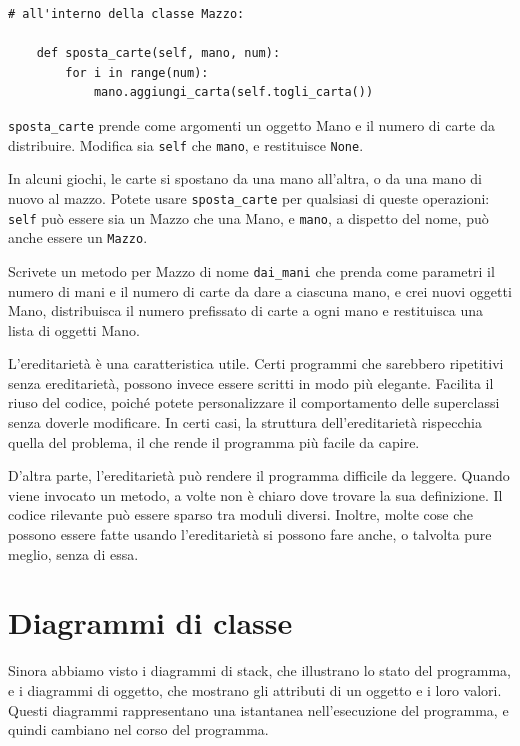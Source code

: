 \documentclass[10pt]{book}
\begin{document}
\begin{verbatim}
# all'interno della classe Mazzo:

    def sposta_carte(self, mano, num):
        for i in range(num):
            mano.aggiungi_carta(self.togli_carta())
\end{verbatim}
%
\verb"sposta_carte" prende come argomenti un oggetto Mano e il numero di carte da distribuire. Modifica sia {\tt self} che {\tt mano}, e restituisce {\tt None}.

In alcuni giochi, le carte si spostano da una mano all'altra, o da una mano di nuovo al mazzo. Potete usare \verb"sposta_carte" per qualsiasi di queste operazioni: {\tt self} può essere sia un Mazzo che una Mano, e {\tt mano}, a dispetto del nome, può anche essere un {\tt Mazzo}.

\vspace{0.2in}
\begin{exercise}

Scrivete un metodo per Mazzo di nome \verb"dai_mani" che prenda come parametri il numero di mani e il numero di carte da dare a ciascuna mano, e crei nuovi oggetti Mano, distribuisca il numero prefissato di carte a ogni mano e restituisca una lista di oggetti Mano.

\end{exercise}

L'ereditarietà è una caratteristica utile. Certi programmi che sarebbero ripetitivi senza ereditarietà, possono invece essere scritti in modo più elegante. Facilita il riuso del codice, poiché potete personalizzare il comportamento delle superclassi senza doverle modificare. In certi casi, la struttura dell'ereditarietà rispecchia quella del problema, il che rende il programma più facile da capire.

D'altra parte, l'ereditarietà può rendere il programma difficile da leggere. Quando viene invocato un metodo, a volte non è chiaro dove trovare la sua definizione. Il codice rilevante può essere sparso tra moduli diversi. Inoltre, molte cose che possono essere fatte usando l'ereditarietà si possono fare anche, o talvolta pure meglio, senza di essa. 


\section{Diagrammi di classe}
\label{class.diagram}

Sinora abbiamo visto i diagrammi di stack, che illustrano lo stato del programma, e i diagrammi di oggetto, che mostrano gli attributi di un oggetto e i loro valori. Questi diagrammi rappresentano una istantanea nell'esecuzione del programma, e quindi cambiano nel corso del programma.
\end{document}
